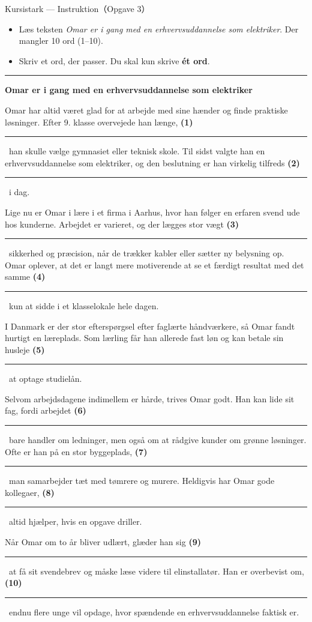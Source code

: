 \begin{emailbox}{Kursistark --- Instruktion（Opgave 3）}
\begin{itemize}
  \item Læs teksten \textit{Omar er i gang med en erhvervsuddannelse som elektriker}. Der mangler 10 ord (1--10).
  \item Skriv et ord, der passer. Du skal kun skrive \textbf{ét ord}.
\end{itemize}

\vspace{0.35em}
\hrule
\vspace{0.45em}

\textbf{\color{NCDNavy}Omar er i gang med en erhvervsuddannelse som elektriker}

\vspace{0.3em}
Omar har altid været glad for at arbejde med sine hænder og finde praktiske løsninger. Efter 9. klasse overvejede han længe, \textbf{(1)}\ \rule{1.8cm}{0.4pt}\ han skulle vælge gymnasiet eller teknisk skole. Til sidst valgte han en erhvervsuddannelse som elektriker, og den beslutning er han virkelig tilfreds \textbf{(2)}\ \rule{1.8cm}{0.4pt}\ i dag.

\vspace{0.25em}
Lige nu er Omar i lære i et firma i Aarhus, hvor han følger en erfaren svend ude hos kunderne. Arbejdet er varieret, og der lægges stor vægt \textbf{(3)}\ \rule{1.8cm}{0.4pt}\ sikkerhed og præcision, når de trækker kabler eller sætter ny belysning op. Omar oplever, at det er langt mere motiverende at se et færdigt resultat med det samme \textbf{(4)}\ \rule{1.8cm}{0.4pt}\ kun at sidde i et klasselokale hele dagen.

\vspace{0.25em}
I Danmark er der stor efterspørgsel efter faglærte håndværkere, så Omar fandt hurtigt en læreplads. Som lærling får han allerede fast løn og kan betale sin husleje \textbf{(5)}\ \rule{1.8cm}{0.4pt}\ at optage studielån.

\vspace{0.25em}
Selvom arbejdsdagene indimellem er hårde, trives Omar godt. Han kan lide sit fag, fordi arbejdet \textbf{(6)}\ \rule{1.8cm}{0.4pt}\ bare handler om ledninger, men også om at rådgive kunder om grønne løsninger. Ofte er han på en stor byggeplads, \textbf{(7)}\ \rule{1.8cm}{0.4pt}\ man samarbejder tæt med tømrere og murere. Heldigvis har Omar gode kollegaer, \textbf{(8)}\ \rule{1.8cm}{0.4pt}\ altid hjælper, hvis en opgave driller.

\vspace{0.25em}
Når Omar om to år bliver udlært, glæder han sig \textbf{(9)}\ \rule{1.8cm}{0.4pt}\ at få sit svendebrev og måske læse videre til elinstallatør. Han er overbevist om, \textbf{(10)}\ \rule{1.8cm}{0.4pt}\ endnu flere unge vil opdage, hvor spændende en erhvervsuddannelse faktisk er.
\end{emailbox}

